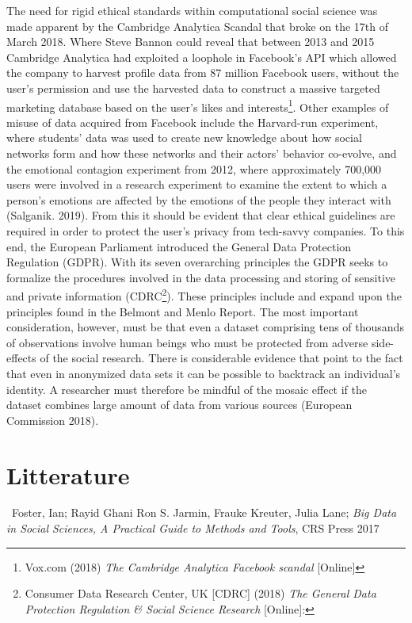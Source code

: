 \documentclass[12pt,a4paper]{article}
\begin{document}
The need for rigid ethical standards within computational social science was made apparent by the Cambridge Analytica Scandal that broke on the 17th of March 2018. Where Steve Bannon could reveal that between 2013 and 2015 Cambridge Analytica had exploited a loophole in Facebook’s API which allowed the company to harvest profile data from 87 million Facebook users, without the user’s permission and use the harvested data to construct a massive targeted marketing database based on the user’s likes and interests\footnote{Vox.com (2018) \textit{The Cambridge Analytica Facebook scandal} [Online]}. Other examples of misuse of data acquired from Facebook include the Harvard-run experiment, where students' data was used to create new knowledge about how social networks form and how these networks and their actors' behavior co-evolve, and the emotional contagion experiment from 2012, where approximately 700,000 users were involved in a research experiment to examine the extent to which a person's emotions are affected by the emotions of the people they interact with (Salganik. 2019).\newline
From this it should be evident that clear ethical guidelines are required in order to protect the user's privacy from tech-savvy companies. To this end, the European Parliament introduced the General Data Protection Regulation (GDPR). With its seven overarching principles the GDPR seeks to formalize the procedures involved in the data processing and storing of sensitive and private information (CDRC\footnote{Consumer Data Research Center, UK  [CDRC] (2018) \textit{The General Data Protection Regulation \& Social Science Research} [Online]:}). These principles include and expand upon the principles found in the Belmont and Menlo Report. The most important consideration, however, must be that even a dataset comprising tens of thousands of observations involve human beings who must be protected from adverse side-effects of the social research. There is considerable evidence that point to the fact that even in anonymized data sets it can be possible to backtrack an individual's identity. A researcher must therefore be mindful of the mosaic effect if the dataset combines large amount of data from various sources (European Commission 2018).

\newpage
\section{Litterature}
\ Foster, Ian; Rayid Ghani Ron S. Jarmin, Frauke Kreuter, Julia Lane; \textit{Big Data in Social Sciences, A Practical Guide to Methods and Tools}, CRS Press 2017
\end{document}
